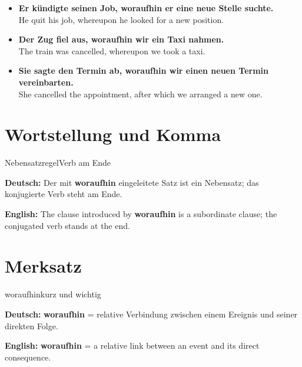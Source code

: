\documentclass[a4paper,11pt]{article}
\newcommand{\GermanText}[1]{\textbf{Deutsch: }#1\par}
\newcommand{\EnglishText}[1]{{\small\color{SoftGray}\textbf{English: }#1\par}}
\newcommand{\ExampleItem}[2]{\item \textbf{#1}\\{\small\color{SoftGray}#2}}
\begin{document}
\begin{exbox}

\begin{itemize}

\ExampleItem{Er kündigte seinen Job, woraufhin er eine neue Stelle suchte.}{He quit his job, whereupon he looked for a new position.}

\ExampleItem{Der Zug fiel aus, woraufhin wir ein Taxi nahmen.}{The train was cancelled, whereupon we took a taxi.}

\ExampleItem{Sie sagte den Termin ab, woraufhin wir einen neuen Termin vereinbarten.}{She cancelled the appointment, after which we arranged a new one.}

\end{itemize}

\end{exbox}

\section{Wortstellung und Komma}

\begin{grammarentry}{Nebensatzregel}{Verb am Ende}

\GermanText{Der mit \textbf{woraufhin} eingeleitete Satz ist ein Nebensatz; das konjugierte Verb steht am Ende.}

\EnglishText{The clause introduced by \textbf{woraufhin} is a subordinate clause; the conjugated verb stands at the end.}

\end{grammarentry}

\section{Merksatz}

\begin{grammarentry}{woraufhin}{kurz und wichtig}

\GermanText{\textbf{woraufhin} = relative Verbindung zwischen einem Ereignis und seiner direkten Folge.}

\EnglishText{\textbf{woraufhin} = a relative link between an event and its direct consequence.}

\end{grammarentry}
\end{document}
